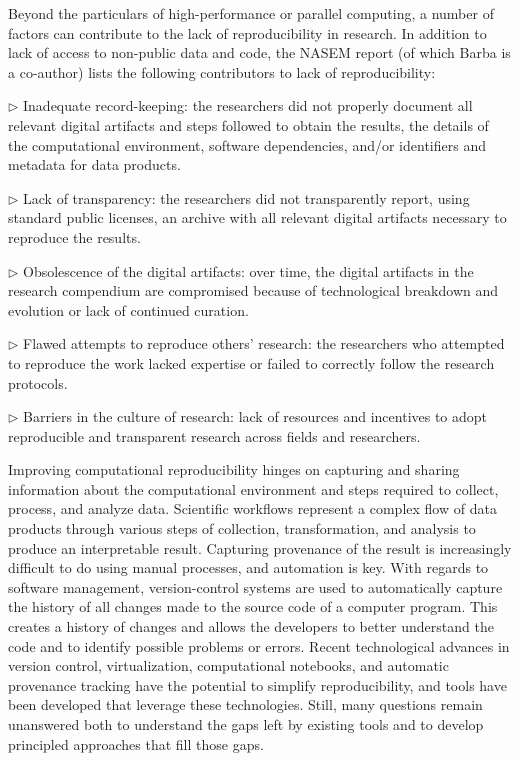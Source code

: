Beyond the particulars of high-performance or parallel computing, 
a number of factors can contribute to the lack of reproducibility in research. 
In addition to lack of access to non-public data and code, the NASEM report (of which Barba is a co-author) lists the following contributors to lack of reproducibility:

\begin{compactitem}

\item[$\triangleright$] Inadequate record-keeping: the researchers did not properly document all relevant digital artifacts and steps followed to obtain the results, the details of the computational environment, software dependencies, and/or identifiers and metadata for data products.
\item[$\triangleright$]  Lack of transparency: the researchers did not transparently report, using standard public licenses, an archive with all relevant digital artifacts necessary to reproduce the results.
\item[$\triangleright$]  Obsolescence of the digital artifacts: over time, the digital artifacts in the research compendium are compromised because of technological breakdown and evolution or lack of continued curation.
\item[$\triangleright$]  Flawed attempts to reproduce others' research: the researchers who attempted to reproduce the work lacked expertise or failed to correctly follow the research protocols.
\item[$\triangleright$]  Barriers in the culture of research: lack of resources and incentives to adopt reproducible and transparent research across fields and researchers.

\end{compactitem}

\noindent
Improving computational reproducibility hinges on capturing and sharing information about the computational environment and steps required to collect, process, and analyze data.
Scientific workflows represent a complex flow of data products through various steps of collection, transformation, and analysis to produce an interpretable result. 
Capturing provenance of the result is increasingly difficult to do using manual processes, and automation is key. 
With regards to software management, version-control systems are used to automatically capture the history of all changes made to the source code of a computer program. 
This creates a history of changes and allows the developers to better understand the code and to identify possible problems or errors.
Recent technological advances in version control, virtualization, computational notebooks, and automatic provenance tracking have the potential to simplify reproducibility, and tools have been developed that leverage these technologies.
Still, many questions remain unanswered both to understand the gaps left by existing tools and to develop principled approaches that fill those gaps. 

